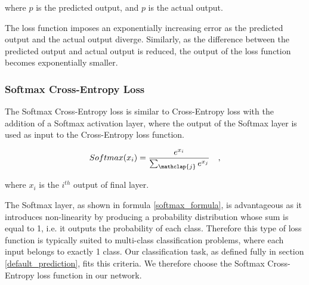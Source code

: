             where $\hat{p}$ is the predicted output, and $p$ is the actual output.
           
            \vspace*{0.3cm}

            The loss function imposes an exponentially increasing error as the predicted output and the actual output diverge. Similarly, as the difference between the predicted output and actual output is reduced, the output of the loss function becomes exponentially smaller.  
            
            

        \subsubsection{Softmax Cross-Entropy Loss}
            The Softmax Cross-Entropy loss is similar to Cross-Entropy loss with the addition of a Softmax activation layer, where the output of the Softmax layer is used as input to the Cross-Entropy loss function. 
            
            \begin{equation} \label{softmax_formula}
                Softmax(x_i) = \frac{e^{x_i}}{\sum_{\mathclap{j}}^{} e^{x_j}} \quad,
            \end{equation}
            
            where $x_i$ is the $i^{th}$ output of final layer.
            
            \vspace*{0.3cm}
            
            The Softmax layer, as shown in formula \ref{softmax_formula}, is advantageous as it introduces non-linearity by producing a probability distribution whose sum is equal to 1, i.e. it outputs the probability of each class. Therefore this type of loss function is typically suited to multi-class classification problems, where each input belongs to exactly 1 class. Our classification task, as defined fully in section \ref{default_prediction}, fits this criteria. We therefore choose the Softmax Cross-Entropy loss function in our network.
            
            
            
